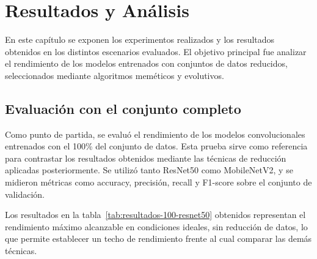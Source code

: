 
\chapter{Resultados y Análisis}\label{ch:resultados-y-analisis}
En este capítulo se exponen los experimentos realizados y los resultados obtenidos en los distintos escenarios evaluados.
El objetivo principal fue analizar el rendimiento de los modelos entrenados con conjuntos de datos reducidos,
seleccionados mediante algoritmos meméticos y evolutivos.


\section{Evaluación con el conjunto completo}\label{sec:evaluacion-con-el-conjunto-completo}
Como punto de partida, se evaluó el rendimiento de los modelos convolucionales entrenados con el 100\% del conjunto de datos.
Esta prueba sirve como referencia para contrastar los resultados obtenidos mediante las técnicas de reducción aplicadas posteriormente.
Se utilizó tanto ResNet50 como MobileNetV2, y se midieron métricas como accuracy, precisión, recall y F1-score sobre el conjunto de validación.

\begin{table}[htp]
    \centering
    \caption{Resultados de ResNet50 entrenado con el 100\% del conjunto de datos.}
    \label{tab:resultados-100-resnet50}
\end{table}

Los resultados en la tabla~\ref{tab:resultados-100-resnet50} obtenidos representan el rendimiento máximo alcanzable en condiciones ideales,
sin reducción de datos, lo que permite establecer un techo de rendimiento frente al cual comparar las demás técnicas.


